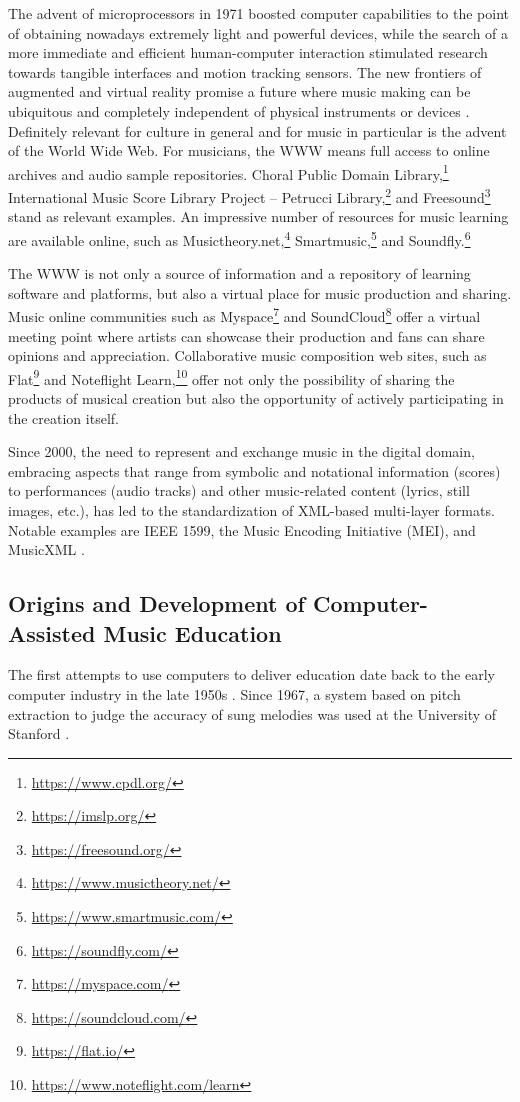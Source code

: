 \documentclass[journal]{IEEEtran}
\begin{document}
The advent of microprocessors in 1971 boosted computer capabilities to the point of obtaining nowadays extremely light and powerful devices, while the search of a more immediate and efficient human-computer interaction stimulated research towards tangible interfaces and motion tracking sensors. The new frontiers of augmented and virtual reality promise a future where music making can be ubiquitous and completely independent of physical instruments or devices \cite{serafin2016virtual}. Definitely relevant for culture in general and for music in particular is the advent of the World Wide Web. For musicians, the WWW means full access to online archives and audio sample repositories. Choral Public Domain Library,\footnote{\url{https://www.cpdl.org/}} International Music Score Library Project -- Petrucci Library,\footnote{\url{https://imslp.org/}} and Freesound\footnote{\url{https://freesound.org/}} stand as relevant examples. An impressive number of resources for music learning are available online, such as Musictheory.net,\footnote{\url{https://www.musictheory.net/}} Smartmusic,\footnote{\url{https://www.smartmusic.com/}} and Soundfly.\footnote{\url{https://soundfly.com/}}

The WWW is not only a source of information and a repository of learning software and platforms, but also a virtual place for music production and sharing. Music online communities such as Myspace\footnote{\url{https://myspace.com/}} and SoundCloud\footnote{\url{https://soundcloud.com/}} offer a virtual meeting point where artists can showcase their production and fans can share opinions and appreciation. Collaborative music composition web sites, such as Flat\footnote{\url{https://flat.io/}} and Noteflight Learn,\footnote{\url{https://www.noteflight.com/learn}} offer not only the possibility of sharing the products of musical creation but also the opportunity of actively participating in the creation itself.

Since 2000, the need to represent and exchange music in the digital domain, embracing aspects that range from symbolic and notational information (scores) to performances (audio tracks) and other music-related content (lyrics, still images, etc.), has led to the standardization of XML-based multi-layer formats. Notable examples are IEEE 1599, the Music Encoding Initiative (MEI), and MusicXML \cite{bhlp2019investigatinginterpretative,barate2012newfrontiers}.


\subsection{Origins and Development of Computer-Assisted Music Education}\label{subsec:MLA}
The first attempts to use computers to deliver education date back to the early computer industry in the late 1950s \cite{suppes1978}. Since 1967, a system based on pitch extraction to judge the accuracy of sung melodies was used at the University of Stanford \cite{kuhn1967}. 
\end{document}
